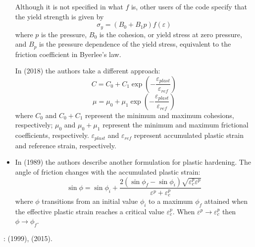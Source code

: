 \begin{itemize}
Although it is not specified in \textcite{dyrm07} what $f$ is, other users of the code 
specify that the yield strength is given by 
\[
\sigma_y = (B_0 + B_1 p ) f(\varepsilon)
\]
where $p$ is the pressure, $B_0$ is the cohesion, or yield stress at
zero pressure, and $B_p$ is the pressure dependence of the yield
stress, equivalent to the friction coefficient in Byerlee's law. 

In \textcite{yamz18} (2018) the authors take a different approach:
\[
C=C_0+C_1 \exp \left( -\frac{\varepsilon_{plast}}{\varepsilon_{ref}} \right)
\]
\[
\mu=\mu_0+\mu_1 \exp \left( -\frac{\varepsilon_{plast}}{\varepsilon_{ref}} \right)
\]
where $C_0$ and $C_0+C_1$ represent the minimum and maximum cohesions, respectively;
$\mu_0$ and $\mu_0+\mu_1$ represent the minimum and maximum frictional coefficients, respectively. 
$\varepsilon_{plast}$ and $\varepsilon_{ref}$ represent accumulated plastic strain and 
reference strain, respectively.

\item In \textcite{leor89} (1989) the authors describe another formulation for plastic hardening. The angle of friction 
changes with the accumulated plastic strain:
\[
\sin \phi = \sin \phi_i  + \frac{2(\sin \phi_f - \sin\phi_i)\sqrt{\varepsilon^p_c  \varepsilon^p }}{\varepsilon^p + \varepsilon^p_c}
\] 
where $\phi$ transitions from an initial value $\phi_i$ to a maximum $\phi_f$ attained when the effective
plastic strain reaches a critical value $\varepsilon_c^p$. When $\varepsilon^p \rightarrow \varepsilon^p_c$
then $\phi \rightarrow \phi_f$.

\end{itemize}


\Literature: \textcite{ster99} (1999), \textcite{nigo15} (2015).
